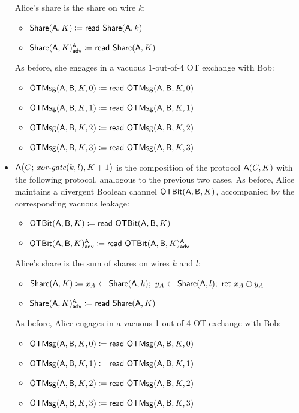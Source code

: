 \begin{itemize}
\begin{itemize}
\end{itemize}
Alice's share is the share on wire $k$:
\begin{itemize}
\item $\Share(\A,K) \coloneqq \read{\Share(\A,k)}$
\item {\color{blue} $\LeakShare(\A,K)^\A_\adv \coloneqq \read{\Share(\A,K)}$}
\end{itemize}
As before, she engages in a vacuous 1-out-of-4 OT exchange with Bob:
\begin{itemize}
\item $\OTMsg(\A,\B,K,0) \coloneqq \read{\OTMsg(\A,\B,K,0)}$
\item $\OTMsg(\A,\B,K,1) \coloneqq \read{\OTMsg(\A,\B,K,1)}$
\item $\OTMsg(\A,\B,K,2) \coloneqq \read{\OTMsg(\A,\B,K,2)}$
\item $\OTMsg(\A,\B,K,3) \coloneqq \read{\OTMsg(\A,\B,K,3)}$
\end{itemize}
\item $\A\big(C; \, \xorgate(k,l),K+1\big)$ is the composition of the protocol $\A(C,K)$ with the following protocol, analogous to the previous two cases. As before, Alice maintains a divergent Boolean channel $\OTBit(\A,\B,K)$, accompanied by the corresponding vacuous leakage:
\begin{itemize}
\item $\OTBit(\A,\B,K) \coloneqq \read{\OTBit(\A,\B,K)}$
\item {\color{blue} $\LeakOTBit(\A,\B,K)^\A_\adv \coloneqq \read{\LeakOTBit(\A,\B,K)^\A_\adv}$}
\end{itemize}
Alice's share is the sum of shares on wires $k$ and $l$:
\begin{itemize}
\item $\Share(\A,K) \coloneqq x_A \leftarrow \Share(\A,k); \ y_A \leftarrow \Share(\A,l); \ \ret{x_A \oplus y_A}$
\item {\color{blue} $\LeakShare(\A,K)^\A_\adv \coloneqq \read{\Share(\A,K)}$}
\end{itemize}
As before, Alice engages in a vacuous 1-out-of-4 OT exchange with Bob:
\begin{itemize}
\item $\OTMsg(\A,\B,K,0) \coloneqq \read{\OTMsg(\A,\B,K,0)}$
\item $\OTMsg(\A,\B,K,1) \coloneqq \read{\OTMsg(\A,\B,K,1)}$
\item $\OTMsg(\A,\B,K,2) \coloneqq \read{\OTMsg(\A,\B,K,2)}$
\item $\OTMsg(\A,\B,K,3) \coloneqq \read{\OTMsg(\A,\B,K,3)}$

\end{itemize}
\end{itemize}

